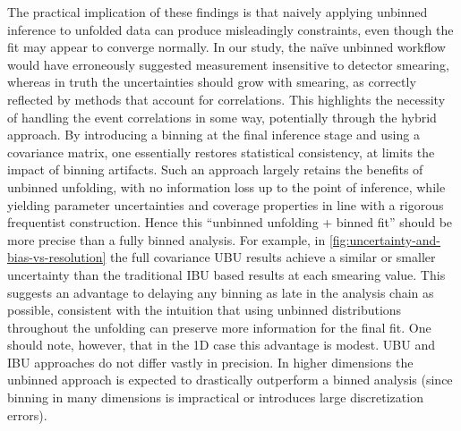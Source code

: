         The practical implication of these findings is that naively applying unbinned inference to unfolded data can produce misleadingly constraints, even though the fit may appear to converge normally.
        In our study, the na\"ive unbinned workflow would have erroneously suggested measurement insensitive to detector smearing, whereas in truth the uncertainties should grow with smearing, as correctly reflected by methods that account for correlations.
        This highlights the necessity of handling the event correlations in some way, potentially through the hybrid approach.
        By introducing a binning at the final inference stage and using a covariance matrix, one essentially restores statistical consistency, at limits the impact of binning artifacts.
        Such an approach largely retains the benefits of unbinned unfolding, with no information loss up to the point of inference, while yielding parameter uncertainties and coverage properties in line with a rigorous frequentist construction.
        Hence this ``unbinned unfolding + binned fit'' should be more precise than a fully binned analysis.
        For example, in \cref{fig:uncertainty-and-bias-vs-resolution} the full covariance UBU results achieve a similar or smaller uncertainty than the traditional IBU based results at each smearing value.
        This suggests an advantage to delaying any binning as late in the analysis chain as possible, consistent with the intuition that using unbinned distributions throughout the unfolding can preserve more information for the final fit.
        One should note, however, that in the 1D case this advantage is modest.
        UBU and IBU approaches do not differ vastly in precision.
        In higher dimensions the unbinned approach is expected to drastically outperform a binned analysis (since binning in many dimensions is impractical or introduces large discretization errors).
    
